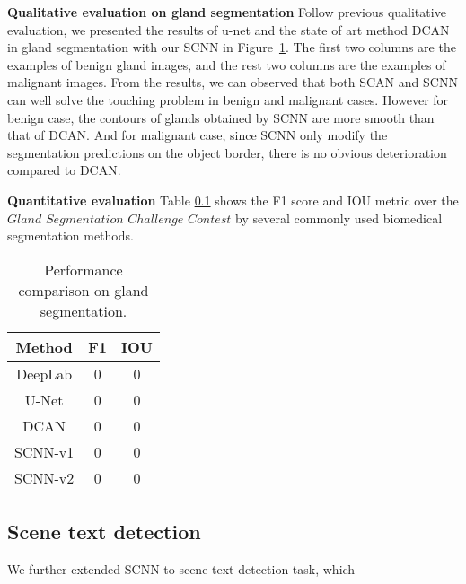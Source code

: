 \textbf{Qualitative evaluation on gland segmentation}
Follow previous qualitative evaluation, we presented the results of u-net and the state of art method DCAN in gland segmentation with our SCNN in Figure~\ref{fig:com-gland}.
The first two columns are the examples of benign gland images, and the rest two columns are the examples of malignant images.
From the results, we can observed that both SCAN and SCNN can well solve the touching problem in benign and malignant cases.
However for benign case, the contours of glands obtained by SCNN are more smooth than that of DCAN.
And for malignant case, since SCNN only modify the segmentation predictions on the object border, there is no obvious deterioration compared to DCAN.

\begin{figure}
	\centering
	\vspace{0.4in}
	\caption{}
	\label{fig:com-gland}
\end{figure}

\textbf{Quantitative evaluation}
Table \ref{} shows the F1 score and IOU metric over the $Gland$ $Segmentation$ $Challenge$ $Contest$ by several commonly used biomedical segmentation methods.

\begin{table}
	\centering
	\caption{Performance comparison on gland segmentation.}
	\begin{tabular}{c|cc}
		\hline 
		Method & F1 & IOU \\
		\hline
		DeepLab & 0 & 0 \\
		U-Net & 0 & 0 \\
		DCAN & 0 & 0 \\
		SCNN-v1 & 0 & 0 \\
		SCNN-v2 & 0 & 0 \\
		\hline
	\end{tabular}
\end{table}


\subsection{Scene text detection}
We further extended SCNN to scene text detection task, which
